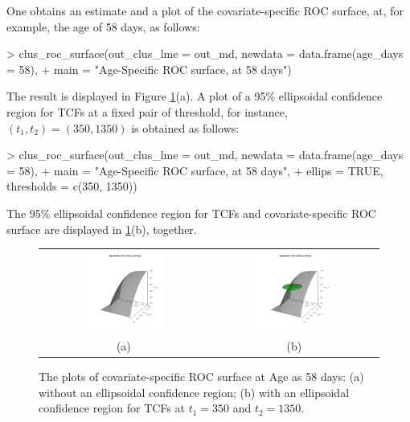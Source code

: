 One obtains an estimate and a plot of the covariate-specific ROC surface, at, for example, the age of 58 days, as follows:
{
\begin{example}
> clus_roc_surface(out_clus_lme = out_md, newdata = data.frame(age_days = 58), 
+                  main = "Age-Specific ROC surface, at 58 days")
\end{example}
}
\noindent
The result is displayed in Figure \ref{fig:ROC-surface}(a). A plot of a 95\% ellipsoidal confidence region for TCFs at a fixed pair of threshold, for instance, $(t_1, t_2) = (350, 1350)$ is obtained as follows:
{
\begin{example}
> clus_roc_surface(out_clus_lme = out_md, newdata = data.frame(age_days = 58), 
+                  main = "Age-Specific ROC surface, at 58 days", 
+                  ellips = TRUE, thresholds = c(350, 1350))
\end{example}
}
\noindent
The 95\% ellipsoidal confidence region for TCFs and covariate-specific ROC surface are displayed in \ref{fig:ROC-surface}(b), together.
\begin{figure}[htbp]
\centering
\begin{tabular}{@{}c @{}c}
\includegraphics[width=0.5\textwidth]{ROCS_Age_58.png} & \includegraphics[width=0.5\textwidth]{ROCS_Age_58_ellip.png} \\
(a) & (b)
\end{tabular}
\caption{The plots of covariate-specific ROC surface at Age as 58 days: (a) without an ellipsoidal confidence region; (b) with an ellipsoidal confidence region for TCFs at $t_1 = 350$ and $t_2 = 1350$.}
\label{fig:ROC-surface}
\end{figure}

